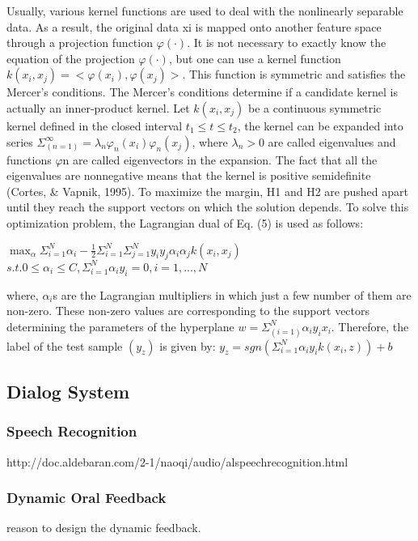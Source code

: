 Usually, various kernel functions are used to deal with the nonlinearly separable data. 
As a result, the original data xi is mapped onto another feature space through a 
projection function ${\varphi(\cdot)}$. It is not necessary to exactly know the equation of the 
projection ${\varphi(\cdot)}$, but one can use a kernel function ${k(x_i,x_j)=<\varphi(x_i),\varphi(x_j)>}$. 
This function is symmetric and satisfies the Mercer’s conditions. The Mercer’s conditions determine 
if a candidate kernel is actually an inner-product kernel. Let ${k(x_i,x_j)}$ be a continuous 
symmetric kernel defined in the closed interval ${t_1\leq t\leq t_2}$, the kernel can be expanded 
into series ${\Sigma_(n=1)^\infty = \lambda_n\varphi_n(x_i)\varphi_n(x_j)}$, where 
${\lambda_n > 0}$ are called eigenvalues and functions $\varphi$n are called eigenvectors in the expansion. 
The fact that all the eigenvalues are nonnegative means that the kernel is positive 
semidefinite (Cortes, \& Vapnik, 1995). 
To maximize the margin, H1 and H2 are pushed apart until they reach the support vectors 
on which the solution depends. To solve this optimization problem, the Lagrangian dual 
of Eq. (5) is used as follows:

$\max_\alpha \Sigma_{i=1}^{N} \alpha_i - \frac{1}{2} \Sigma_{i=1}^{N} \Sigma_{j=1}^{N} y_i y_j \alpha_i \alpha_j k(x_i, x_j)$\newline
$s.t. 0 \le \alpha_i \le C, \Sigma_{i=1}^{N} \alpha_i y_i = 0, i = 1, ..., N$\newline

where, ${\alpha_i}$s are the Lagrangian multipliers in which just a few number of them are 
non-zero. These non-zero values are corresponding to the support vectors determining 
the parameters of the hyperplane ${w = \Sigma_(i=1)^N\alpha_iy_ix_i }$. Therefore, the label 
of the test sample ${(y_z)}$ is given by:
$y_z = sgn(\Sigma_{i=1}^{N} \alpha_i y_i k(x_i, z)) + b$\newline

\subsection{Dialog System}

\subsubsection{Speech Recognition}
http://doc.aldebaran.com/2-1/naoqi/audio/alspeechrecognition.html

\subsubsection{Dynamic Oral Feedback}
reason to design the dynamic feedback. 

\